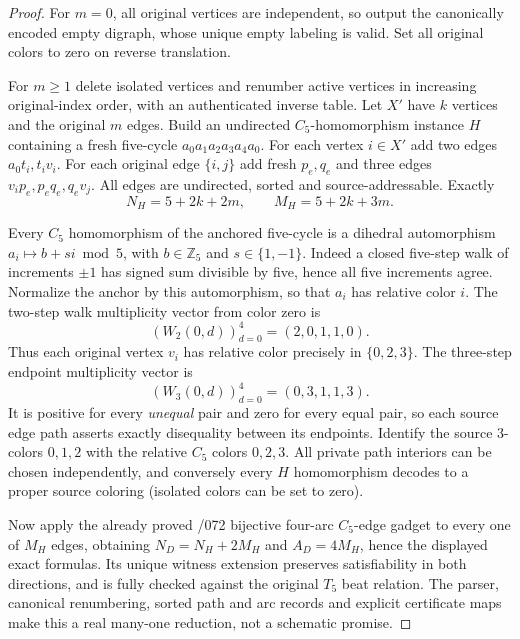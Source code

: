\documentclass[11pt]{article}
\begin{document}
\begin{proof}
For $m=0$, all original vertices are independent, so output the
canonically encoded empty digraph, whose unique empty labeling is
valid. Set all original colors to zero on reverse translation.

For $m\ge1$ delete isolated vertices and renumber active vertices
in increasing original-index order, with an authenticated inverse
table. Let $X'$ have $k$ vertices and the original $m$ edges.
Build an undirected $C_5$-homomorphism instance $H$ containing a
fresh five-cycle $a_0a_1a_2a_3a_4a_0$. For each vertex $i\in X'$
add two edges $a_0t_i,t_iv_i$. For each original edge
$\{i,j\}$ add fresh $p_e,q_e$ and three edges
$v_ip_e,p_eq_e,q_ev_j$. All edges are undirected, sorted and
source-addressable. Exactly
\[
  N_H=5+2k+2m,\qquad M_H=5+2k+3m.
\]

Every $C_5$ homomorphism of the anchored five-cycle is a
dihedral automorphism $a_i\mapsto b+si\bmod5$, with
$b\in\mathbb Z_5$ and $s\in\{1,-1\}$. Indeed a closed
five-step walk of increments $\pm1$ has signed sum divisible
by five, hence all five increments agree. Normalize the
anchor by this automorphism, so that $a_i$ has relative
color $i$. The two-step walk multiplicity vector from
color zero is
\[
 (W_2(0,d))_{d=0}^4=(2,0,1,1,0).
\]
Thus each original vertex $v_i$ has relative color precisely
in $\{0,2,3\}$. The three-step endpoint multiplicity vector is
\[
 (W_3(0,d))_{d=0}^4=(0,3,1,1,3).
\]
It is positive for every \emph{unequal} pair and zero for every
equal pair, so each source edge path asserts exactly disequality
between its endpoints. Identify the source 3-colors
$0,1,2$ with the relative $C_5$ colors $0,2,3$.
All private path interiors can be chosen independently,
and conversely every $H$ homomorphism decodes to a proper
source coloring (isolated colors can be set to zero).

Now apply the already proved /072 bijective four-arc
$C_5$-edge gadget to every one of $M_H$ edges, obtaining
$N_D=N_H+2M_H$ and $A_D=4M_H$, hence the displayed
exact formulas. Its unique witness extension preserves
satisfiability in both directions, and is fully checked
against the original $T_5$ beat relation. The parser,
canonical renumbering, sorted path and arc records and
explicit certificate maps make this a real many-one
reduction, not a schematic promise.


\end{proof}
\end{document}
